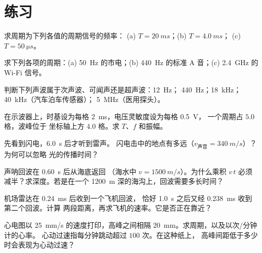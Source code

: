 \section{练习}

\begin{exercise}[$\star$]\label{exo:g10:signals-and-waves:1}
求周期为下列各值的周期信号的频率：
(a) $T = \qty{20}{ms}$；(b) $T = \qty{4.0}{ms}$；
(c) $T = \qty{50}{\micro s}$。
\end{exercise}

\begin{exercise}[$\star$]\label{exo:g10:signals-and-waves:2}
求下列各项的周期：(a) \qty{50}{Hz} 的市电；(b) \qty{440}{Hz}
的标准 A 音；(c) \qty{2.4}{GHz} 的 Wi-Fi 信号。
\end{exercise}

\begin{exercise}[$\star$]\label{exo:g10:signals-and-waves:3}
判断下列声波属于次声波、可闻声还是超声波：\qty{12}{Hz}；
\qty{440}{Hz}；\qty{18}{kHz}；\qty{40}{kHz}（汽车泊车传感器）；
\qty{5}{MHz}（医用探头）。
\end{exercise}

\begin{exercise}[$\star$]\label{exo:g10:signals-and-waves:4}
在示波器上，时基设为每格 \qty{2}{ms}，电压灵敏度设为每格 \qty{0.5}{V}，
一个周期占 $5.0$ 格，波峰位于
坐标轴上方 $4.0$ 格。求 $T$、$f$ 和振幅。
\end{exercise}

\begin{exercise}[$\star$]\label{exo:g10:signals-and-waves:5}
先看到闪电，\qty{6.0}{s} 后才听到雷声。
闪电击中的地点有多远（$v_{\text{声音}} = \qty{340}{m/s}$）？为何可以忽略
光的传播时间？
\end{exercise}

\begin{exercise}[$\star\star$]\label{exo:g10:signals-and-waves:6}
声呐回波在 \qty{0.60}{s} 后从海底返回
（海水中 $v = \qty{1500}{m/s}$）。为什么乘积 $v\,t$ 必须
减半？求深度。若是在一个
\qty{1200}{m} 深的海沟上，回波需要多长时间？
\end{exercise}

\begin{exercise}[$\star\star$]\label{exo:g10:signals-and-waves:7}
机场雷达在 \qty{0.24}{ms} 后收到一个飞机回波，
恰好 \qty{1.0}{s} 之后又经 \qty{0.238}{ms} 收到第二个回波。计算
两段距离，再求飞机的速率。它是否正在靠近？
\end{exercise}

\begin{exercise}[$\star\star$]\label{exo:g10:signals-and-waves:8}
心电图以 \qty{25}{mm/s} 的速度打印，高峰之间相隔
\qty{20}{mm}。求周期，以及以次/分钟计的心率。
心动过速指每分钟跳动超过 $100$ 次。在这种纸上，
高峰间距低于多少时会表现为心动过速？
\end{exercise}


